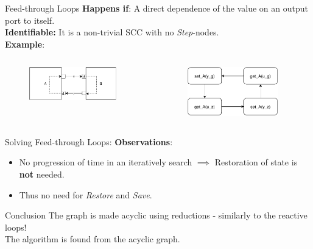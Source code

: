 \documentclass{beamer}
\begin{document}
\begin{frame}{Feed-through Loops}
    \textbf{Happens if}: A direct dependence of the value on an output port to itself.\\
    \textbf{Identifiable:} It is a non-trivial SCC with no \textit{Step}-nodes. \\
    \textbf{Example}: 
    \begin{columns}[T] %
        \begin{column}{.48\textwidth}
            \begin{figure}    
                \includegraphics[width=0.9\textwidth]{images/feedthroughloop.pdf}
            \end{figure}
    \end{column}%
    \hfill%
    \begin{column}{.48\textwidth}
        \begin{figure}    
            \includegraphics[width=0.9\textwidth]{images/feed_loop_dep.pdf}
        \end{figure}
    \end{column}%
    \end{columns}
\end{frame}

\begin{frame}{Solving Feed-through Loops:}
    \textbf{Observations}: 
    \begin{itemize}
        \item No progression of time in an iteratively search $\implies$ Restoration of state is \textbf{not} needed.
        \item Thus no need for \textit{Restore} and \textit{Save}.
    \end{itemize}
    \begin{block}{Conclusion}
        The graph is made acyclic using reductions - similarly to the reactive loops! \\
        The algorithm is found from the acyclic graph.
    \end{block}
\end{frame}
\end{document}
